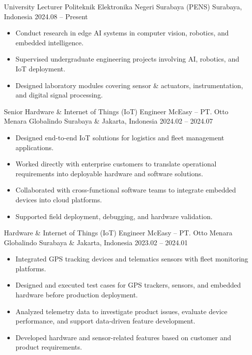 \begin{sectionbody}

\cventry
    {University Lecturer}
    {Politeknik Elektronika Negeri Surabaya (PENS)}
    {Surabaya, Indonesia}
    {2024.08 -- Present}
    {
        \begin{itemize}[itemsep=1pt, topsep=2pt]
            \item Conduct research in edge AI systems in computer vision, robotics, and embedded intelligence.
            \item Supervised undergraduate engineering projects involving AI, robotics, and IoT deployment.
            \item Designed laboratory modules covering sensor \& actuators, instrumentation, and digital signal processing.
        \end{itemize}
    }

\cventry
    {Senior Hardware \& Internet of Things (IoT) Engineer}
    {McEasy -- PT. Otto Menara Globalindo}
    {Surabaya \& Jakarta, Indonesia}
    {2024.02 -- 2024.07}
    {
        \begin{itemize}[itemsep=1pt, topsep=2pt]
            \item Designed end-to-end IoT solutions for logistics and fleet management applications.
            \item Worked directly with enterprise customers to translate operational requirements into deployable hardware and software solutions.
            \item Collaborated with cross-functional software teams to integrate embedded devices into cloud platforms.
            \item Supported field deployment, debugging, and hardware validation.
        \end{itemize}
    }

\cventry
    {Hardware \& Internet of Things (IoT) Engineer}
    {McEasy -- PT. Otto Menara Globalindo}
    {Surabaya \& Jakarta, Indonesia}
    {2023.02 -- 2024.01}
    {
        \begin{itemize}[itemsep=1pt, topsep=2pt]
            \item Integrated GPS tracking devices and telematics sensors with fleet monitoring platforms.
            \item Designed and executed test cases for GPS trackers, sensors, and embedded hardware before production deployment.
            \item Analyzed telemetry data to investigate product issues, evaluate device performance, and support data-driven feature development.
            \item Developed hardware and sensor-related features based on customer and product requirements.
        \end{itemize}
    }


\end{sectionbody}
